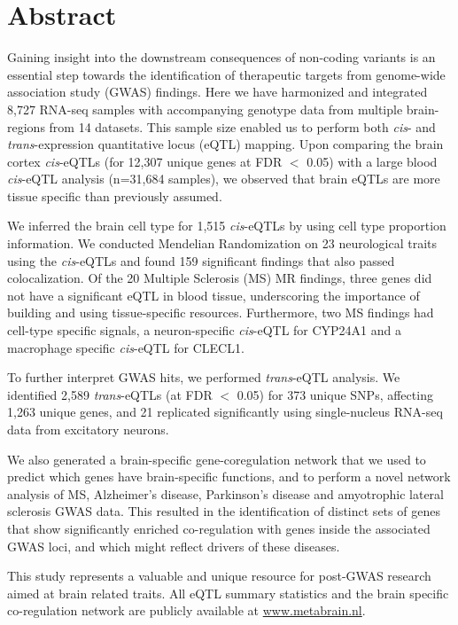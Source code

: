 \newpage

\section*{Abstract}
Gaining insight into the downstream consequences of non-coding variants is an essential step towards the identification of therapeutic targets from genome-wide association study (GWAS) findings.  Here we have harmonized and integrated 8,727 RNA-seq samples with accompanying genotype data from multiple brain-regions from 14 datasets. This sample size enabled us to perform both \textit{cis}- and \textit{trans}-expression quantitative locus (eQTL) mapping. Upon comparing the brain cortex \textit{cis}-eQTLs (for 12,307 unique genes at FDR $<$ 0.05) with a large blood \textit{cis}-eQTL analysis (n=31,684 samples), we observed that brain eQTLs are more tissue specific than previously assumed. 

We inferred the brain cell type for 1,515 \textit{cis}-eQTLs by using cell type proportion information. We conducted Mendelian Randomization on 23 neurological traits using the \textit{cis}-eQTLs and found 159 significant findings that also passed colocalization. Of the 20 Multiple Sclerosis (MS) MR findings, three genes did not have a significant eQTL in blood tissue, underscoring the importance of building and using tissue-specific resources. Furthermore, two MS findings had cell-type specific signals, a neuron-specific \textit{cis}-eQTL for CYP24A1 and a macrophage specific \textit{cis}-eQTL for CLECL1.  

To further interpret GWAS hits, we performed \textit{trans}-eQTL analysis. We identified 2,589 \textit{trans}-eQTLs (at FDR $<$ 0.05) for 373 unique SNPs, affecting 1,263 unique genes, and 21 replicated significantly using single-nucleus RNA-seq data from excitatory neurons.  

We also generated a brain-specific gene-coregulation network that we used to predict which genes have brain-specific functions, and to perform a novel network analysis of MS, Alzheimer’s disease, Parkinson’s disease and amyotrophic lateral sclerosis GWAS data. This resulted in the identification of distinct sets of genes that show significantly enriched co-regulation with genes inside the associated GWAS loci, and which might reflect drivers of these diseases. 

This study represents a valuable and unique resource for post-GWAS research aimed at brain related traits. All eQTL summary statistics and the brain specific co-regulation network are publicly available at \url{www.metabrain.nl}. 

